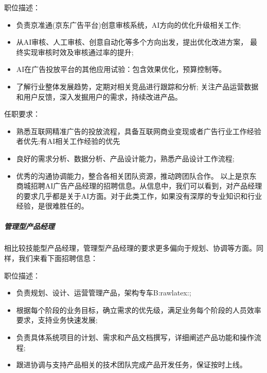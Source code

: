 \documentclass[letterpaper,11pt,english]{sphinxmanual}
\begin{document}
职位描述：
\begin{itemize}
\item {} 
负责京准通(京东广告平台)创意审核系统，AI方向的优化升级相关工作;

\item {} 
从AI审核、人工审核、创意自动化等多个方向出发，提出优化改进方案，
最终实现审核时效及审核通过率的提升;

\item {} 
AI在广告投放平台的其他应用试验：包含效果优化，预算控制等。

\item {} 
了解行业整体发展趋势，定期对相关竞品进行跟踪和分析;
关注产品运营数据和用户反馈，深入发掘用户的需求，持续改进产品。

\end{itemize}

任职要求：
\begin{itemize}
\item {} 
熟悉互联网精准广告的投放流程，具备互联网商业变现或者广告行业工作经验者优先;有AI相关工作经验的优先

\item {} 
良好的需求分析、数据分析、产品设计能力，熟悉产品设计工作流程;

\item {} 
优秀的沟通协调能力，整合各相关团队资源，推动跨团队合作。
以上是京东商城招聘AI广告产品经理的招聘信息。从信息中，我们可以看到，对产品经理的要求几乎都是关于AI方面。对于此类工作，如果没有深厚的专业知识和行业经验，是很难胜任的。

\end{itemize}


\subparagraph{管理型产品经理}
\label{\detokenize{chapter_introduction/PM:id40}}
相比较技能型产品经理，管理型产品经理的要求更多偏向于规划、协调等方面。同样，我们来看下面招聘信息：

职位描述：
\begin{itemize}
\item {} 
负责规划、设计、运营管理产品，架构专车B:raw\sphinxhyphen{}latex:;

\item {} 
根据每个阶段的业务目标，确立需求的优先级，满足业务每个阶段的人员效率要求，支持业务快速发展;

\item {} 
负责具体系统项目的计划、需求和产品文档撰写，详细阐述产品功能和操作流程;

\item {} 
跟进协调与支持产品相关的技术团队完成产品开发任务，保证按时上线。

\end{itemize}
\end{document}
